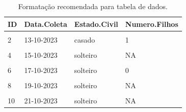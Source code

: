 \documentclass[
]{book}
\begin{document}
\begin{table}

\caption{\label{tab:tabela-recomendada}Formatação recomendada para tabela de dados.}
\centering
\begin{tabu} to 
\toprule
\textbf{ID} & \textbf{Data.Coleta} & \textbf{Estado.Civil} & \textbf{Numero.Filhos}\\
\midrule
{} &  &  & \\
2 & 13-10-2023 & casado & 1\\
 &  &  & \\
4 & 15-10-2023 & solteiro & NA\\
 &  &  & \\
6 & 17-10-2023 & solteiro & 0\\
 &  &  & \\
8 & 19-10-2023 & solteiro & NA\\
 &  &  & \\
10 & 21-10-2023 & solteiro & NA\\
\bottomrule
\end{tabu}
\end{table}
\end{document}
